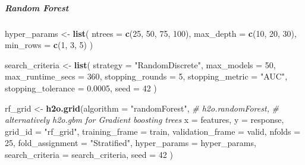 \documentclass[]{article}
\newenvironment{Shaded}{\begin{snugshade}}{\end{snugshade}}
\newcommand{\KeywordTok}[1]{\textcolor[rgb]{0.13,0.29,0.53}{\textbf{{#1}}}}
\newcommand{\DataTypeTok}[1]{\textcolor[rgb]{0.13,0.29,0.53}{{#1}}}
\newcommand{\DecValTok}[1]{\textcolor[rgb]{0.00,0.00,0.81}{{#1}}}
\newcommand{\FloatTok}[1]{\textcolor[rgb]{0.00,0.00,0.81}{{#1}}}
\newcommand{\StringTok}[1]{\textcolor[rgb]{0.31,0.60,0.02}{{#1}}}
\newcommand{\CommentTok}[1]{\textcolor[rgb]{0.56,0.35,0.01}{\textit{{#1}}}}
\newcommand{\NormalTok}[1]{{#1}}
\let\oldsubparagraph\subparagraph
\renewcommand{\subparagraph}[1]{\oldsubparagraph{#1}\mbox{}}
\begin{document}
\subparagraph{Random Forest}\label{random-forest}

\begin{Shaded}
\begin{Highlighting}[]
\NormalTok{hyper_params <-}\StringTok{ }\KeywordTok{list}\NormalTok{(}
                     \DataTypeTok{ntrees =} \KeywordTok{c}\NormalTok{(}\DecValTok{25}\NormalTok{, }\DecValTok{50}\NormalTok{, }\DecValTok{75}\NormalTok{, }\DecValTok{100}\NormalTok{),}
                     \DataTypeTok{max_depth =} \KeywordTok{c}\NormalTok{(}\DecValTok{10}\NormalTok{, }\DecValTok{20}\NormalTok{, }\DecValTok{30}\NormalTok{),}
                     \DataTypeTok{min_rows =} \KeywordTok{c}\NormalTok{(}\DecValTok{1}\NormalTok{, }\DecValTok{3}\NormalTok{, }\DecValTok{5}\NormalTok{)}
                     \NormalTok{)}

\NormalTok{search_criteria <-}\StringTok{ }\KeywordTok{list}\NormalTok{(}
                        \DataTypeTok{strategy =} \StringTok{"RandomDiscrete"}\NormalTok{, }
                        \DataTypeTok{max_models =} \DecValTok{50}\NormalTok{,}
                        \DataTypeTok{max_runtime_secs =} \DecValTok{360}\NormalTok{,}
                        \DataTypeTok{stopping_rounds =} \DecValTok{5}\NormalTok{,          }
                        \DataTypeTok{stopping_metric =} \StringTok{"AUC"}\NormalTok{,      }
                        \DataTypeTok{stopping_tolerance =} \FloatTok{0.0005}\NormalTok{,}
                        \DataTypeTok{seed =} \DecValTok{42}
                        \NormalTok{)}
\end{Highlighting}
\end{Shaded}

\begin{Shaded}
\begin{Highlighting}[]
\NormalTok{rf_grid <-}\StringTok{ }\KeywordTok{h2o.grid}\NormalTok{(}\DataTypeTok{algorithm =} \StringTok{"randomForest"}\NormalTok{, }\CommentTok{# h2o.randomForest, }
                                                \CommentTok{# alternatively h2o.gbm for Gradient boosting trees}
                    \DataTypeTok{x =} \NormalTok{features,}
                    \DataTypeTok{y =} \NormalTok{response,}
                    \DataTypeTok{grid_id =} \StringTok{"rf_grid"}\NormalTok{,}
                    \DataTypeTok{training_frame =} \NormalTok{train,}
                    \DataTypeTok{validation_frame =} \NormalTok{valid,}
                    \DataTypeTok{nfolds =} \DecValTok{25}\NormalTok{,                           }
                    \DataTypeTok{fold_assignment =} \StringTok{"Stratified"}\NormalTok{,}
                    \DataTypeTok{hyper_params =} \NormalTok{hyper_params,}
                    \DataTypeTok{search_criteria =} \NormalTok{search_criteria,}
                    \DataTypeTok{seed =} \DecValTok{42}
                    \NormalTok{)}
\end{Highlighting}
\end{Shaded}
\end{document}
